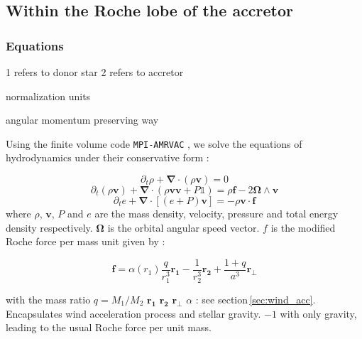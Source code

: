 \documentclass[a4paper,fleqn,usenatbib]{article}
\begin{document}
\subsection{Within the Roche lobe of the accretor}
\label{sec:Roche_lobe}

\subsubsection{Equations}
\label{sec:HD_eq}

1 refers to donor star
2 refers to accretor

normalization units

angular momentum preserving way

Using the finite volume code \texttt{MPI-AMRVAC} \citep{Xia2017}, we solve the equations of hydrodynamics under their conservative form :

\begin{equation}
\label{eq:eq1}
\partial _t \rho + \boldsymbol{\nabla} \cdot \left( \rho \mathbf{v} \right) = 0
\end{equation}
\begin{equation}
\label{eq:eq2}
\partial _t \left( \rho \mathbf{v} \right) + \boldsymbol {\nabla} \cdot \left( \rho \mathbf{v} \mathbf{v} + P \mathbb{1} \right) = \rho \mathbf{f} - 2 \boldsymbol{\Omega} \wedge \mathbf{v}
\end{equation}
\begin{equation}
\label{eq:eq3}
\partial _t  e  + \boldsymbol{\nabla} \cdot \left[ \left( e + P \right) \mathbf{v} \right] = - \rho \mathbf{v} \cdot \mathbf{f}
\end{equation}
where $\rho$, $\mathbf{v}$, $P$ and $e$ are the mass density, velocity, pressure and total energy density respectively. $\boldsymbol{\Omega}$ is the orbital angular speed vector. $f$ is the modified Roche force per mass unit given by : 

\begin{equation}
\mathbf{f}=\alpha\left( r_1 \right) \frac{q}{r_1^3}\mathbf{r_1} - \frac{1}{r_2^3}\mathbf{r_2} + \frac{1+q}{a^3}\mathbf{r_{\perp}}
\end{equation}

with the mass ratio $q=M_1/M_2$
$\mathbf{r_1}$
$\mathbf{r_2}$
$\mathbf{r_{\perp}}$
$\alpha$ : see section\,\ref{sec:wind_acc}. Encapsulates wind acceleration process and stellar gravity. $-1$ with only gravity, leading to the usual Roche force per unit mass.
\end{document}
